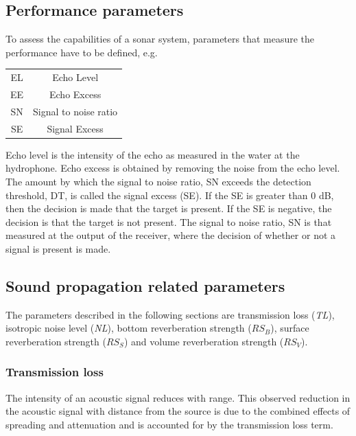 \subsection{ Performance parameters } \label{ Performance parameters }
\noindent To assess the capabilities of a sonar system, parameters that measure the performance have to be defined, e.g.
\begin{center}
\begin{tabular}{ |c|c| } 
 \hline
  EL & Echo Level  \\ 
  EE & Echo Excess  \\ 
  SN & Signal to noise ratio  \\ 
  SE & Signal Excess \\
  \hline
\end{tabular}
\end{center}
\noindent Echo level is the intensity of the echo as measured in the water at the hydrophone. Echo excess is obtained by removing the noise from the echo level. The amount by which the signal to noise ratio, SN exceeds the detection threshold, DT, is called the signal excess (SE). If the SE is greater than 0 dB, then the decision is made that the target is present. If the SE is negative, the decision is that the target is not present. The signal to noise ratio, SN is that measured at the output of the receiver, where the decision of whether or not a signal is present is made.

\newpage

\subsection{ Sound propagation related parameters } \label{ Sound propagation related parameters }
\noindent The parameters described in the following sections are transmission loss (\textit{TL}), isotropic noise level (\textit{NL}), bottom reverberation strength (\textit{$RS_B$}), surface reverberation strength (\textit{$RS_S$}) and volume reverberation strength (\textit{$RS_V$}).

\subsubsection{ Transmission loss } \label{ Transmission loss }
\noindent The intensity of an acoustic signal reduces with range. This observed reduction in the acoustic signal with distance from the source is due to the combined effects of spreading and attenuation and is accounted for by the transmission loss term.

